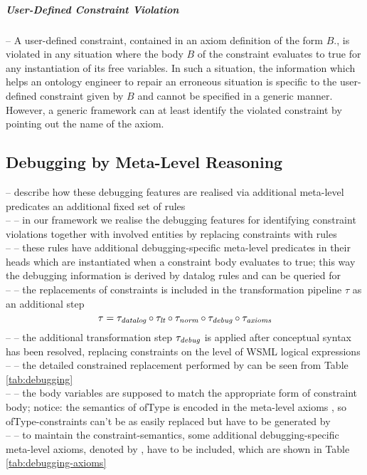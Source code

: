 \subparagraph{User-Defined Constraint Violation} -- A user-defined
constraint, contained in an axiom definition of the form
 \axiomid {} $B.$, is violated in any
situation where the body $B$ of the constraint evaluates to true
for any instantiation of its free variables. In such a situation,
the information which helps an ontology engineer to repair an
erroneous situation is specific to the user-defined constraint
given by $B$ and cannot be specified in a generic manner. However,
a generic framework can at least identify the violated constraint
by pointing out the name \axiomid of the axiom.

\subsection{Debugging by Meta-Level Reasoning}
-- describe how these debugging features are realised via additional meta-level predicates an additional fixed set of rules \\
-- -- in our framework we realise the debugging features for identifying constraint violations together with involved entities by replacing constraints with rules \\
-- -- these rules have additional debugging-specific meta-level predicates in their heads which are instantiated when a constraint body evaluates to true; this way the debugging information is derived by datalog rules and can be queried for \\
-- -- the replacements of constraints is included in the transformation pipeline $\tau$ as an additional step \\
\begin{displaymath}
    \tau = \transdlog \circ \translt \circ \transnorm \circ \transdebug \circ \transax
\end{displaymath}
-- -- the additional transformation step $\transdebug$ is applied after conceptual syntax has been resolved, replacing constraints on the level of WSML logical expressions \\
-- -- the detailed constrained replacement performed by \transdebug can be seen from Table \ref{tab:debugging} \\
-- -- the body variables are supposed to match the appropriate form of constraint body; notice: the semantics of ofType is encoded in the meta-level axioms \mlaxioms, so ofType-constraints can't be as easily replaced but have to be generated by \transdebug \\
-- -- to maintain the constraint-semantics, some additional debugging-specific meta-level axioms, denoted by \debugaxioms, have to be included, which are shown in Table \ref{tab:debugging-axioms} \\

